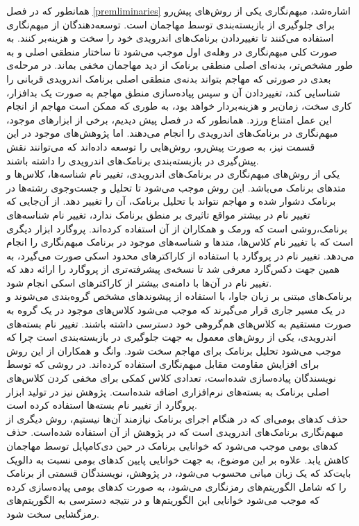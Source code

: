 همانطور که در فصل \ref{premliminaries} اشاره‌شد، مبهم‌نگاری یکی از روش‌های پیش‌رو برای جلوگیری از بازبسته‌بندی توسط مهاجمان است. توسعه‌دهندگان از مبهم‌نگاری استفاده می‌کنند تا تغییردادن برنامک‌های اندرویدی خود را سخت و هزینه‌بر کنند. به صورت کلی مبهم‌نگاری در وهله‌ی اول موجب می‌شود تا ساختار منطقی اصلی و به طور مشخص‌تر، بدنه‌ای اصلی منطقی برنامک از دید مهاجمان مخفی بماند. در مرحله‌ی بعدی در صورتی که مهاجم بتواند بدنه‌‌ی منطقی اصلی برنامک‌ اندرویدی قربانی را شناسایی کند، تغییردادن آن و سپس پیاده‌سازی منطق مهاجم به صورت یک بدافزار، کاری سخت، زمان‌بر و هزینه‌بردار خواهد بود، به طوری که ممکن است مهاجم از انجام این عمل امتناع ورزد. همانطور که در فصل پیش دیدیم، برخی از ابزار‌های موجود، مبهم‌نگاری در برنامک‌های اندرویدی را انجام می‌دهند. اما پژوهش‌های موجود در این قسمت نیز، به صورت پیش‌رو، روش‌هایی را توسعه داده‌اند که می‌توانند نقش پیش‌گیری در بازبسته‌بندی برنامک‌های اندرویدی را داشته باشند.\\
یکی از روش‌های مبهم‌نگاری در برنامک‌های اندرویدی، تغییر نام شناسه‌ها، کلاس‌ها و متد‌های برنامک می‌باشد. این روش موجب می‌شود تا تحلیل و جست‌وجوی رشته‌ها در برنامک دشوار شده و مهاجم نتواند با تحلیل برنامک، آن را تغییر دهد. از آن‌جایی که تغییر نام در بیشتر مواقع تاثیری بر منطق برنامک ندارد، تغییر نام شناسه‌های برنامک،‌روشی است که ورمک و همکاران از آن استفاده کرده‌اند. پروگارد ابزار دیگری است که با تغییر نام کلاس‌ها، متد‌ها و شناسه‌های موجود در برنامک مبهم‌نگاری را انجام می‌دهد. تغییر نام در پروگارد با استفاده از کاراکتر‌های محدود اسکی صورت می‌گیرد، به همین جهت دکس‌گارد معرفی شد تا نسخه‌ی پیشرفته‌تری از پروگارد را ارائه دهد که تغییر نام در آن‌ها با دامنه‌ی بیشتر از کاراکتر‌های اسکی انجام شود.\\
برنامک‌های مبتنی بر زبان جاوا، با استفاده از پیشوند‌های مشخص‌ گروه‌بندی می‌شوند و در یک مسیر جاری قرار می‌گیرند که موجب می‌شود کلاس‌های موجود در یک گروه به صورت مستقیم به کلاس‌های هم‌گروهی خود دسترسی داشته باشند. تغییر نام بسته‌های اندرویدی، یکی از روش‌های معمول به جهت جلوگیری در بازبسته‌بندی است چرا که موجب می‌شود تحلیل برنامک برای مهاجم سخت شود. وانگ و همکاران از این روش برای افزایش مقاومت مقابل مبهم‌نگاری استفاده کرده‌اند. در روشی که توسط نویسندگان پیاده‌سازی شده‌است، تعدادی کلاس کمکی برای مخفی کردن کلاس‌های اصلی برنامک به بسته‌های نرم‌افزاری اضافه‌ شده‌است. پژوهش نیز در تولید ابزار پروگارد از تغییر نام بسته‌ها استفاده کرده‌ است.\\
حذف کد‌های بومی‌ای که در هنگام اجرای برنامک نیازمند آن‌ها نیستیم، روش دیگری از مبهم‌نگاری برنامک‌های اندرویدی است که در پژوهش از آن استفاده شده‌است. حذف کد‌های بومی موجب می‌شود که خوانایی برنامک در حین دی‌کامپایل توسط مهاجمان کاهش یابد. علاوه بر این موضوع، به جهت خوانایی پایین کد‌های بومی نسبت به دالویک بایت‌کد که یک زبان میانی محسوب می‌شود، در پژوهش، نویسندگان قسمتی از برنامک را که شامل الگوریتم‌های رمزنگاری می‌شود، به صورت کد‌های بومی پیاده‌سازی کرده که موجب می‌شود خوانایی این الگوریتم‌ها و در نتیجه دسترسی به الگوریتم‌های رمز‌گشایی سخت شود.\\
